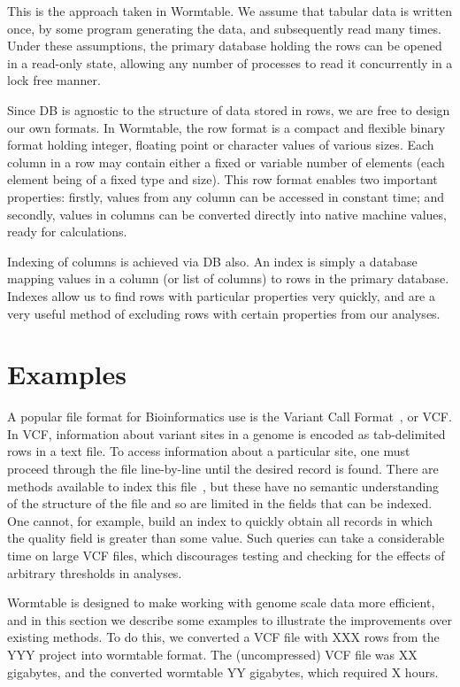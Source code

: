 \documentclass{bioinfo}
\begin{document}
This is the approach taken in Wormtable. We assume that tabular data 
is written once, by some program generating the data, and subsequently 
read many times. Under these assumptions, the primary database 
holding the rows can be opened in a read-only state, allowing any 
number of processes to read it concurrently in a lock free manner.

Since DB is agnostic to the structure of data stored in rows, we 
are free to design our own formats. In Wormtable, the row format is
a compact and flexible binary format holding integer, floating point 
or character values of various sizes. Each column in a row may contain 
either a fixed or variable number of elements (each element being of a
fixed type and size). This row format enables two important properties:
firstly, values from any column can be accessed in constant 
time; and secondly, values in columns can be converted directly into 
native machine values, ready for calculations.

Indexing of columns is achieved via DB also. An index is simply a
database mapping values in a column (or list of columns) to rows 
in the primary database. Indexes allow us to find rows with particular 
properties very quickly, and are a very useful method of excluding 
rows with certain properties from our analyses.

\section{Examples}

A popular file format for Bioinformatics use is the Variant Call Format~\citep{da+11},
or VCF. In VCF,  information about variant sites in a genome is encoded 
as tab-delimited rows in a text file. To access information about a 
particular site, one must proceed through the file line-by-line until the 
desired record is found. There are methods available to index this 
file~\citep{li11}, but these have no semantic 
understanding of the structure of the file and so are limited in the 
fields that can be indexed. One cannot, for example, build an index 
to quickly obtain all records in which the quality field is greater
than some value. Such queries can take a considerable time on large VCF 
files, which discourages testing and checking for the effects of 
arbitrary thresholds in analyses.


Wormtable is designed to make working with genome scale data more 
efficient, and in this section we describe some examples to 
illustrate the improvements over existing methods. To do this, 
we converted a VCF file with XXX rows from the YYY project 
into wormtable format. The (uncompressed) VCF file was XX
gigabytes, and the converted wormtable YY gigabytes, which required 
X hours.
\end{document}

